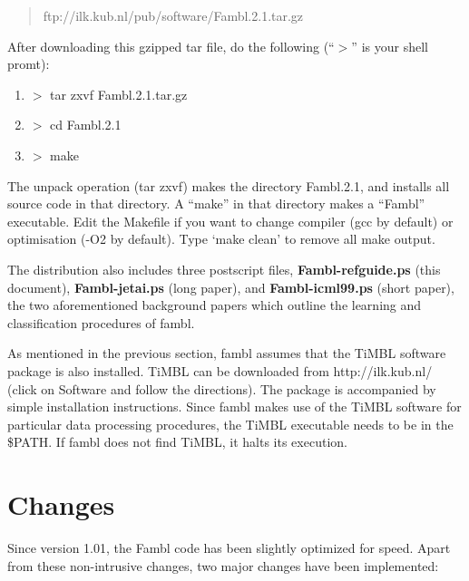 \documentclass[11pt]{article}
\begin{document}
\begin{quote}
	ftp://ilk.kub.nl/pub/software/Fambl.2.1.tar.gz
\end{quote}

After downloading this gzipped tar file, do the following (``$>$'' is
your shell promt):

\begin{enumerate}
\item
$>$ tar zxvf Fambl.2.1.tar.gz
\item
$>$ cd Fambl.2.1
\item
$>$ make
\end{enumerate}

The unpack operation (tar zxvf) makes the directory Fambl.2.1, and
installs all source code in that directory. A ``make'' in that
directory makes a ``Fambl'' executable. Edit the Makefile if you want
to change compiler (gcc by default) or optimisation (-O2 by
default). Type `make clean' to remove all make output.

The distribution also includes three postscript files, {\bf
Fambl-refguide.ps} (this document), {\bf Fambl-jetai.ps} (long paper),
and {\bf Fambl-icml99.ps} (short paper), the two aforementioned
background papers which outline the learning and classification
procedures of {\sc fambl}.

As mentioned in the previous section, {\sc fambl} assumes that the
TiMBL software package is also installed. TiMBL can be downloaded from
http://ilk.kub.nl/ (click on Software and follow the directions). The
package is accompanied by simple installation instructions. Since {\sc
fambl} makes use of the TiMBL software for particular data processing
procedures, the TiMBL executable needs to be in the \$PATH. If {\sc
fambl} does not find TiMBL, it halts its execution.


\section{Changes}
\label{changes}

Since version 1.01, the {\sc Fambl} code has been slightly optimized
for speed.  Apart from these non-intrusive changes, two major changes
have been implemented:
\end{document}
